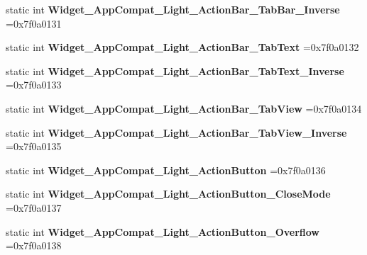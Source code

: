 \begin{DoxyCompactItemize}
static int {\bfseries Widget\+\_\+\+App\+Compat\+\_\+\+Light\+\_\+\+Action\+Bar\+\_\+\+Tab\+Bar\+\_\+\+Inverse} =0x7f0a0131
\item 
\mbox{\label{classandroid_1_1support_1_1design_1_1R_1_1style_a5a00bbc77b6712d9476fea41f0fc8228}} 
static int {\bfseries Widget\+\_\+\+App\+Compat\+\_\+\+Light\+\_\+\+Action\+Bar\+\_\+\+Tab\+Text} =0x7f0a0132
\item 
\mbox{\label{classandroid_1_1support_1_1design_1_1R_1_1style_ab3e2c8af98df675fd67dce47da67184c}} 
static int {\bfseries Widget\+\_\+\+App\+Compat\+\_\+\+Light\+\_\+\+Action\+Bar\+\_\+\+Tab\+Text\+\_\+\+Inverse} =0x7f0a0133
\item 
\mbox{\label{classandroid_1_1support_1_1design_1_1R_1_1style_a05f456a8fce9d71c47fbfb39aa4e1c29}} 
static int {\bfseries Widget\+\_\+\+App\+Compat\+\_\+\+Light\+\_\+\+Action\+Bar\+\_\+\+Tab\+View} =0x7f0a0134
\item 
\mbox{\label{classandroid_1_1support_1_1design_1_1R_1_1style_a15ed71231e527b3d698612d143177f09}} 
static int {\bfseries Widget\+\_\+\+App\+Compat\+\_\+\+Light\+\_\+\+Action\+Bar\+\_\+\+Tab\+View\+\_\+\+Inverse} =0x7f0a0135
\item 
\mbox{\label{classandroid_1_1support_1_1design_1_1R_1_1style_adbe483315c5b5cae18cb373e0a2c37ae}} 
static int {\bfseries Widget\+\_\+\+App\+Compat\+\_\+\+Light\+\_\+\+Action\+Button} =0x7f0a0136
\item 
\mbox{\label{classandroid_1_1support_1_1design_1_1R_1_1style_af99e2600d0fa843836691841a6e4b697}} 
static int {\bfseries Widget\+\_\+\+App\+Compat\+\_\+\+Light\+\_\+\+Action\+Button\+\_\+\+Close\+Mode} =0x7f0a0137
\item 
\mbox{\label{classandroid_1_1support_1_1design_1_1R_1_1style_a7f522d207e5cb7c2f009fadc711cdb47}} 
static int {\bfseries Widget\+\_\+\+App\+Compat\+\_\+\+Light\+\_\+\+Action\+Button\+\_\+\+Overflow} =0x7f0a0138
\item 

\end{DoxyCompactItemize}

